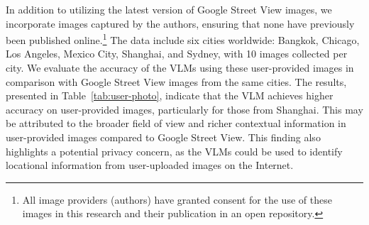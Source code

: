 In addition to utilizing the latest version of Google Street View images, we incorporate images captured by the authors, ensuring that none have previously been published online.\footnote{All image providers (authors) have granted consent for the use of these images in this research and their publication in an open repository.}
The data include six cities worldwide: Bangkok, Chicago, Los Angeles, Mexico City, Shanghai, and Sydney, with 10 images collected per city.
We evaluate the accuracy of the VLMs using these user-provided images in comparison with Google Street View images from the same cities.
The results, presented in Table~\ref{tab:user-photo}, indicate that the VLM achieves higher accuracy on user-provided images, particularly for those from Shanghai.
This may be attributed to the broader field of view and richer contextual information in user-provided images compared to Google Street View.
This finding also highlights a potential privacy concern, as the VLMs could be used to identify locational information from user-uploaded images on the Internet.

\begin{table}[t]
    \centering
    \caption{City-level accuracy of GPT-4o and Gemini on Google Street View images and user-uploaded images. ``LA'' is Los Angeles while ``MC'' is Mexico City.}
    \label{tab:user-photo}
\end{table}

\begin{table}[t]
    \centering
    \caption{City-level accuracy of GPT-4o and Gemini on the Chinatown views. ``NYC'' is New York City. ``Joburg'' is Johannesburg.}
    \label{tab:chinatown}
\end{table}

